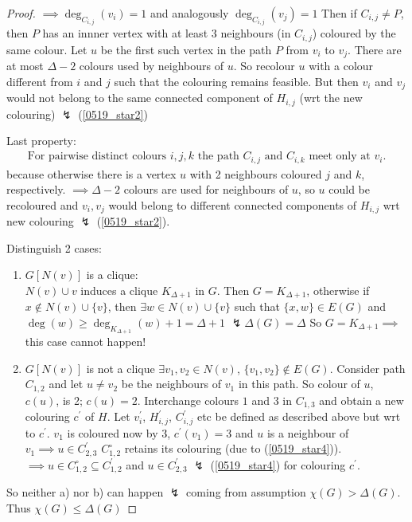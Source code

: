 \documentclass[aagt.tex]{subfiles}
\begin{document}
\begin{proof}
  $\implies \deg_{C_{i,j}}(v_i) = 1$ and analogously $\deg_{C_{i,j}}(v_j) = 1$
  Then if $C_{i,j} \neq P$, then $P$ has an innner vertex with at least 3 neighbours (in $C_{i,j}$) coloured by the same colour.
  Let $u$ be the first such vertex in the path $P$ from $v_i$ to $v_j$.
  There are at most $\Delta - 2$ colours used by neighbours of $u$.
  So recolour $u$ with a colour different from $i$ and $j$ such that the colouring remains feasible.
  But then $v_i$ and $v_j$ would not belong to the same connected component of $H_{i,j}$ (wrt the new colouring) $\lightning$ (\ref{0519_star2})
  
  Last property:
  \begin{align}\label{0519_star4}
    \text{For pairwise distinct colours } i,j,k \text{ the path } C_{i,j} \text{ and } C_{i,k} \text{ meet only at } v_i \text{.}
  \end{align}
  because otherwise there is a vertex $u$ with 2 neighbours coloured $j$ and $k$, respectively.
  $\implies \Delta-2$ colours are used for neighbours of $u$, so $u$ could be recoloured and $v_i, v_j$ would belong to different connected components of $H_{i,j}$ wrt new colouring $\lightning$ (\ref{0519_star2}).
  
  Distinguish 2 cases:
  \begin{enumerate}[label=\alph*)]
    \item $G[N(v)]$ is a clique:\\
    $N(v) \cup v$ induces a clique $K_{\Delta+1}$ in $G$.
    Then $G = K_{\Delta+1}$, otherwise if $x \notin N(v) \cup \{v\}$, then $\exists w \in N(v) \cup \{v\}$ such that $\{x,w\} \in E(G)$ and $\deg(w) \geq \deg_{K_{\Delta+1}}(w) + 1 = \Delta + 1$ $\lightning \Delta(G) = \Delta$
    So $G = K_{\Delta+1} \implies$ this case cannot happen!
    \item $G[N(v)]$ is not a clique
    $\exists v_1,v_2 \in N(v)$, $\{v_1,v_2\} \notin E(G)$.
    Consider path $C_{1,2}$ and let $u \neq v_2$ be the neighbours of $v_1$ in this path.
    So colour of $u$, $c(u)$, is 2; $c(u) = 2$.
    Interchange colours $1$ and $3$ in $C_{1,3}$ and obtain a new colouring $c^\prime$ of $H$.
    Let $v_i^\prime$, $H_{i,j}^\prime$, $C_{i,j}^\prime$ etc be defined as described above but wrt to $c^\prime$.
    $v_1$ is coloured now by $3$, $c^\prime(v_1) = 3$ and $u$ is a neighbour of $v_1 \implies u \in C_{2,3}^\prime$
    $C_{1,2}^\circ$ retains its colouring (due to (\ref{0519_star4})).
    $\implies u \in C_{1,2}^\circ \subseteq C_{1,2}^\prime$ and $u \in C_{2,3}^\prime$ $\lightning$ (\ref{0519_star4}) for colouring $c^\prime$.
  \end{enumerate}
  So neither a) nor b) can happen $\lightning$ coming from assumption $\chi(G) > \Delta(G)$.
  Thus $\chi(G) \leq \Delta(G)$
\end{proof}
\end{document}
